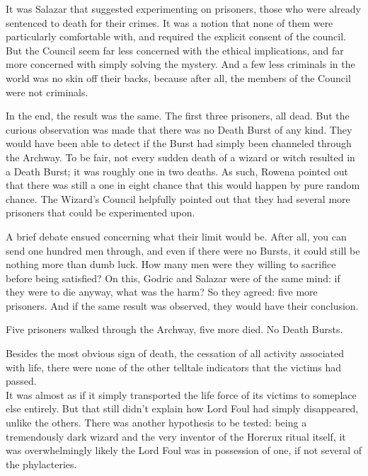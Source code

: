 It was Salazar that suggested experimenting on prisoners, those who were already sentenced to death for their crimes. It was a notion that none of them were particularly comfortable with, and required the explicit consent of the council. But the Council seem far less concerned with the ethical implications, and far more concerned with simply solving the mystery. And a few less criminals in the world was no skin off their backs, because after all, the members of the Council were not criminals.

In the end, the result was the same. The first three prisoners, all dead. But the  curious observation was made that there was no Death Burst of any kind. They would have been able to detect if the Burst had simply been channeled through the Archway. To be fair, not every sudden death of a wizard or witch resulted in a Death Burst; it was roughly one in two deaths. As such, Rowena pointed out that there was still a one in eight chance that this would happen by pure random chance. The Wizard’s Council helpfully pointed out that they had several more prisoners that could be experimented upon.

A brief debate ensued concerning what their limit would be. After all, you can send one hundred men through, and even if there were no Bursts, it could still be nothing more than dumb luck. How many men were they willing to sacrifice before being satisfied? On this, Godric and Salazar were of the same mind: if they were to die anyway, what was the harm? So they agreed: five more prisoners. And if the same result was observed, they would have their conclusion.

Five prisoners walked through the Archway, five more died. No Death Bursts.

Besides the most obvious sign of death, the cessation of all activity associated with life, there were none of the other telltale indicators that the victims had passed.\\It was almost as if it simply transported the life force of its victims to someplace else entirely. But that still didn’t explain how Lord Foul had simply disappeared, unlike the others. There was another hypothesis to be tested: being a tremendously dark wizard and the very inventor of the Horcrux ritual itself, it was overwhelmingly likely the Lord Foul was in possession of one, if not several of the phylacteries.

